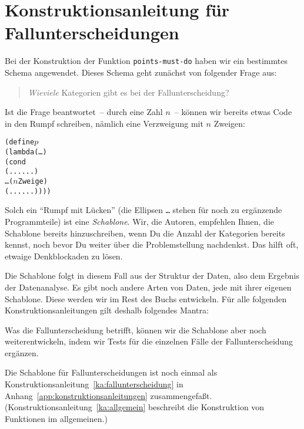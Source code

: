 \begin{mantra}\label{mantra:coverage}
  
\end{mantra}

\section{Konstruktionsanleitung für Fallunterscheidungen}

Bei der Konstruktion der Funktion \texttt{points-must-do} haben wir
ein bestimmtes Schema angewendet.  Dieses Schema geht zunächst von folgender
Frage aus:
%
\begin{quote}
  \emph{Wieviele} Kategorien gibt es bei der Fallunterscheidung?
\end{quote}
%
Ist die Frage beantwortet~-- durch eine Zahl $n$~-- können wir bereits
etwas Code in den Rumpf schreiben, nämlich eine Verzweigung mit $n$
Zweigen:
%
\begin{alltt}
(define \(p\)
  (lambda (\ldots)
    (cond
      (... ...)
      \ldots{}\hspace{1in}\textrm{(\(n\) Zweige)}
      (... ...))))
\end{alltt}
%
Solch ein "`Rumpf mit Lücken"' (die Ellipsen
\texttt{\ldots} stehen für noch zu ergänzende Programmteile) ist eine
\textit{Schablone}.  Wir, die Autoren, empfehlen
Ihnen, die Schablone bereits hinzuschreiben, wenn Du die Anzahl der
Kategorien bereits kennst, noch bevor Du weiter über die
Problemstellung nachdenkst.  Das hilft oft, etwaige Denkblockaden zu
lösen.

Die Schablone folgt in diesem Fall aus der Struktur der Daten, also
dem Ergebnis der Datenanalyse.  Es gibt noch andere Arten von Daten,
jede mit ihrer eigenen Schablone.  Diese werden wir im Rest des Buchs
entwickeln.
Für alle folgenden Konstruktionsanleitungen gilt deshalb folgendes Mantra:

\begin{mantra}[Schablone]\label{mantra:data-analysis}
  
\end{mantra}

Was die Fallunterscheidung betrifft, können wir die Schablone aber
noch weiterentwickeln, indem wir Tests für die einzelnen Fälle der
Fallunterscheidung ergänzen.

Die Schablone für Fallunterscheidungen ist noch einmal
als Konstruktionsanleitung~\ref{ka:fallunterscheidung} in
Anhang~\ref{app:konstruktionsanleitungen} zusammengefaßt.
(Konstruktionsanleitung~\ref{ka:allgemein} beschreibt die Konstruktion
von Funktionen im allgemeinen.)

